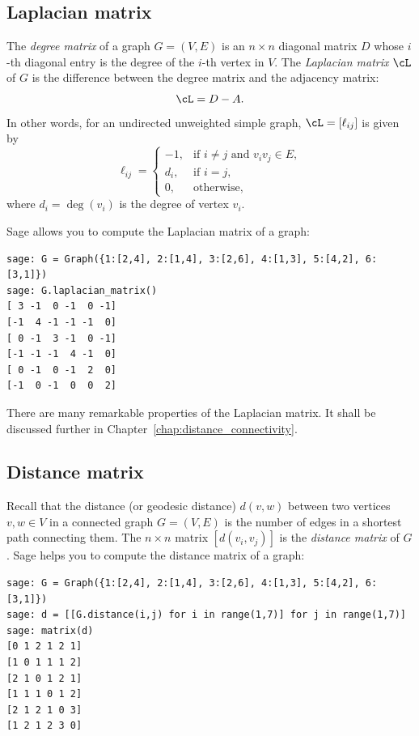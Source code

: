 
\subsection{Laplacian matrix}

The \emph{degree matrix} of a graph $G = (V,E)$
is an $n \times n$ diagonal matrix $D$ whose $i$-th diagonal entry is
the degree of the $i$-th vertex in $V$. The
\emph{Laplacian matrix} $\cL$\index{$\cL$} of
$G$ is the difference between the degree matrix and the adjacency
matrix:
\[
\cL = D - A.
\]
In other words, for an undirected unweighted simple graph,
$\cL = [\ell_{ij}]$ is given by
\[
\ell_{ij}
=
\begin{cases}
-1,  & \text{if $i \neq j$ and $v_i v_j \in E$}, \\
d_i, & \text{if $i = j$}, \\
0,   & \text{otherwise},
\end{cases}
\]
where $d_i = \deg(v_i)$ is the degree of vertex $v_i$.

Sage allows you to compute the Laplacian matrix of a graph:
\begin{lstlisting}
sage: G = Graph({1:[2,4], 2:[1,4], 3:[2,6], 4:[1,3], 5:[4,2], 6:[3,1]})
sage: G.laplacian_matrix()
[ 3 -1  0 -1  0 -1]
[-1  4 -1 -1 -1  0]
[ 0 -1  3 -1  0 -1]
[-1 -1 -1  4 -1  0]
[ 0 -1  0 -1  2  0]
[-1  0 -1  0  0  2]
\end{lstlisting}
There are many remarkable properties of the Laplacian matrix. It shall
be discussed further in Chapter~\ref{chap:distance_connectivity}.



\subsection{Distance matrix}
\label{sec:introduction:distance_matrix}

Recall that the distance (or geodesic distance) $d(v,w)$ between two
vertices $v,w \in V$ in a connected graph $G = (V,E)$ is the number of
edges in a shortest path connecting them. The $n \times n$ matrix
$[d(v_i, v_j)]$ is the \emph{distance matrix}
of $G$. Sage helps you to compute the distance matrix of a graph:
\begin{lstlisting}
sage: G = Graph({1:[2,4], 2:[1,4], 3:[2,6], 4:[1,3], 5:[4,2], 6:[3,1]})
sage: d = [[G.distance(i,j) for i in range(1,7)] for j in range(1,7)]
sage: matrix(d)
[0 1 2 1 2 1]
[1 0 1 1 1 2]
[2 1 0 1 2 1]
[1 1 1 0 1 2]
[2 1 2 1 0 3]
[1 2 1 2 3 0]
\end{lstlisting}

